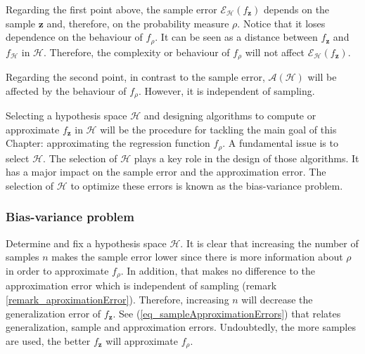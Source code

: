 \begin{remark}
  Regarding the first point above, the sample error $\mathcal{E}_{\mathcal{H}}(f_{\pmb{z}})$ depends on the sample $\pmb{z}$ and, therefore, on the probability measure $\rho$. Notice that it loses dependence on the behaviour of $f_{\rho}$. It can be seen as a distance between $f_{\pmb{z}}$ and $f_{\mathcal{H}}$ in $\mathcal{H}$. Therefore, the complexity or behaviour of $f_{\rho}$ will not affect $\mathcal{E}_{\mathcal{H}}(f_{\pmb{z}})$.
  
  Regarding the second point, in contrast to the sample error, $\mathcal{A}(\mathcal{H})$ will be affected by the behaviour of $f_{\rho}$. However, it is independent of sampling. %
\end{remark}

Selecting a hypothesis space $\mathcal{H}$ and designing algorithms to compute or approximate $f_{\pmb{z}}$ in $\mathcal{H}$ will be the procedure for tackling the main goal of this Chapter: approximating the regression function $f_{\rho}$. A fundamental issue is to select $\mathcal{H}$. The selection of $\mathcal{H}$ plays a key role in the design of those algorithms. It has a major impact on the sample error and the approximation error. The selection of $\mathcal{H}$ to optimize these errors is known as the bias-variance problem.


 
\subsubsection{Bias-variance problem} \label{sec_BiasVariance}

Determine and fix a hypothesis space $\mathcal{H}$. It is clear that increasing the number of samples $n$ makes the sample error lower since there is more information about $\rho$ in order to approximate $f_{\rho}$. In addition, that makes no difference to the approximation error which is independent of sampling (remark \ref{remark_aproximationError}). Therefore, increasing $n$ will decrease the generalization error of $f_{\pmb{z}}$. See (\ref{eq_sampleApproximationErrors}) that relates generalization, sample and approximation errors. Undoubtedly, the more samples are used, the better $f_{\pmb{z}}$ will approximate $f_{\rho}$.
 
